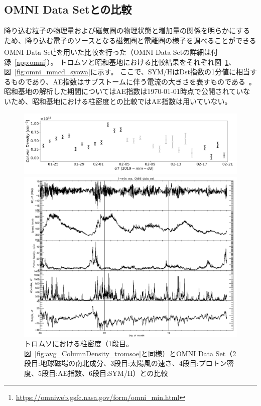 \subsection{OMNI Data Setとの比較}
\label{ssec:comparison_omni}
降り込む粒子の物理量および磁気圏の物理状態と増加量の関係を明らかにするため、降り込む電子のソースとなる磁気圏と電離圏の様子を調べることができるOMNI Data Set\footnote{\url{https://omniweb.gsfc.nasa.gov/form/omni_min.html}}を用いた比較を行った（OMNI Data Setの詳細は付録~\ref{app:omni}）。
トロムソと昭和基地における比較結果をそれぞれ図~\ref{fig:omni_mmcd_tromsoe}、図~\ref{fig:omni_mmcd_syowa}に示す。
ここで、SYM/HはDst指数の1分値に相当するものであり、AE指数はサブストームに伴う電流の大きさを表すものである~\cite{wdc2009asysym,wdc2022onAEindex}。
昭和基地の解析した期間についてはAE指数は\today 時点で公開されていないため、昭和基地における柱密度との比較ではAE指数は用いていない。\par
\begin{figure}[htbp]
    \centering
    \begin{minipage}{\linewidth}
        \centering
        \includegraphics[width=\linewidth]{master_thesis_contents/master_thesis_fig/avg_ColumnDensity_tromsoe.pdf}
    \end{minipage}
    \begin{minipage}{\linewidth}
        \centering
        \includegraphics[width=\linewidth]{master_thesis_contents/master_thesis_fig/omni_tromsoe.pdf}
    \end{minipage}
    \caption{トロムソにおける柱密度（1段目。図~\ref{fig:avg_ColumnDensity_tromsoe}と同様）とOMNI Data Set（2段目:地球磁場の南北成分、3段目:太陽風の速さ、4段目:プロトン密度、5段目:AE指数、6段目:SYM/H）との比較}
    \label{fig:omni_mmcd_tromsoe}
\end{figure}

